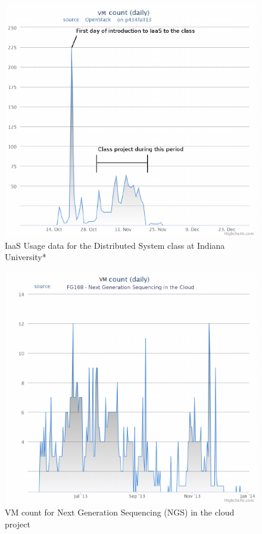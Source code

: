\documentclass{sig-alternate}
\begin{document}
\begin{figure}[h!] 
  \centering 
    \includegraphics[width=1.0\columnwidth]{images/fig1.pdf} 
  \caption{IaaS Usage data for the Distributed System class at Indiana University*}\label{F:fig2} 
\end{figure} 



\begin{figure}[h!] 
  \centering 
    \includegraphics[width=1.0\columnwidth]{images/fig2.pdf} 
  \caption{VM count for Next Generation Sequencing (NGS) in the cloud project}\label{F:fig3} 
\end{figure} 
\end{document}
